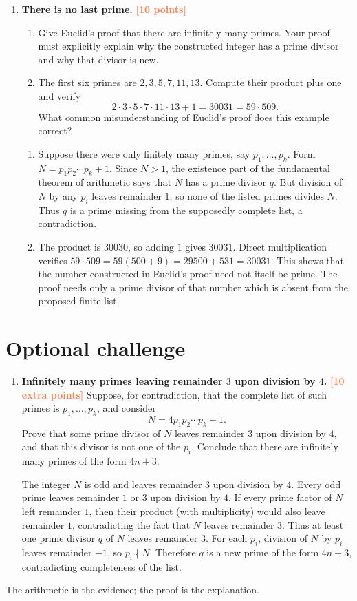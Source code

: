 \documentclass[11pt]{article}
\newcommand{\ndivides}{\nmid}
\newcommand{\points}[1]{\hfill\textcolor{coral}{\small\bfseries[#1 points]}}
\begin{document}
\begin{enumerate}[resume]
\item \textbf{There is no last prime.} \points{10}
\begin{enumerate}
  \item Give Euclid's proof that there are infinitely many primes. Your proof
  must explicitly explain why the constructed integer has a prime divisor and
  why that divisor is new.
  \item The first six primes are $2,3,5,7,11,13$. Compute their product plus
  one and verify
  \[
    2\cdot3\cdot5\cdot7\cdot11\cdot13+1=30031=59\cdot509.
  \]
  What common misunderstanding of Euclid's proof does this example correct?
\end{enumerate}
\begin{solution}
\begin{enumerate}
  \item Suppose there were only finitely many primes, say
  $p_1,\ldots,p_k$. Form $N=p_1p_2\cdots p_k+1$. Since $N>1$, the existence
  part of the fundamental theorem of arithmetic says that $N$ has a prime
  divisor $q$. But division of $N$ by any $p_i$ leaves remainder $1$, so none
  of the listed primes divides $N$. Thus $q$ is a prime missing from the
  supposedly complete list, a contradiction.
  \item The product is $30030$, so adding $1$ gives $30031$. Direct
  multiplication verifies
  $59\cdot509=59(500+9)=29500+531=30031$.
  This shows that the number constructed in Euclid's proof need not itself be
  prime. The proof needs only a prime divisor of that number which is absent
  from the proposed finite list.
\end{enumerate}
\end{solution}
\end{enumerate}

\section*{Optional challenge}

\begin{enumerate}[resume]
\item \textbf{Infinitely many primes leaving remainder $3$ upon division by $4$.}
\points{10 extra}
Suppose, for contradiction, that the complete list of such primes is
$p_1,\ldots,p_k$, and consider
\[
  N=4p_1p_2\cdots p_k-1.
\]
Prove that some prime divisor of $N$ leaves remainder $3$ upon division by $4$,
and that this divisor is not one of the $p_i$. Conclude that there are
infinitely many primes of the form $4n+3$.
\begin{solution}
The integer $N$ is odd and leaves remainder $3$ upon division by $4$. Every odd
prime leaves remainder $1$ or $3$ upon division by $4$. If every prime factor
of $N$ left remainder $1$, then their product (with multiplicity) would also
leave remainder $1$, contradicting the fact that $N$ leaves remainder $3$.
Thus at least one prime divisor $q$ of $N$ leaves remainder $3$. For each
$p_i$, division of $N$ by $p_i$ leaves remainder $-1$, so $p_i\ndivides N$.
Therefore $q$ is a new prime of the form $4n+3$, contradicting completeness of
the list.
\end{solution}
\end{enumerate}

\vfill
\begin{center}
\color{muted}\small
The arithmetic is the evidence; the proof is the explanation.
\end{center}
\end{document}
